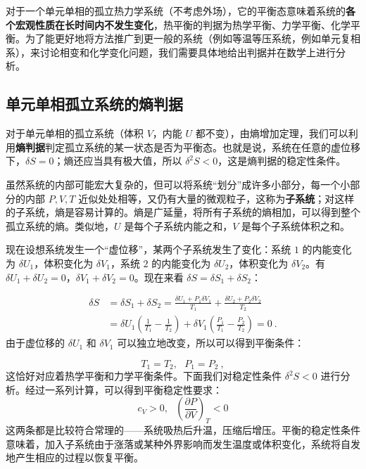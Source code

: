 
对于一个单元单相的孤立热力学系统（不考虑外场），它的平衡态意味着系统的\textbf{各个宏观性质在长时间内不发生变化}，热平衡的判据为热学平衡、力学平衡、化学平衡。为了能更好地将方法推广到更一般的系统（例如等温等压系统，例如单元复相系），来讨论相变和化学变化问题，我们需要具体地给出判据并在数学上进行分析。

\subsection{单元单相孤立系统的熵判据}

对于单元单相的孤立系统（体积 $V$，内能 $U$ 都不变），由熵增加定理，我们可以利用\textbf{熵判据}判定孤立系统的某一状态是否为平衡态。也就是说，系统在任意的虚位移下，$\delta S=0$；熵还应当具有极大值，所以 $\delta^2S<0$，这是熵判据的稳定性条件。

虽然系统的内部可能宏大复杂的，但可以将系统“划分”成许多小部分，每一个小部分的内部 $P,V,T$ 近似处处相等，又仍有大量的微观粒子，这称为\textbf{子系统}；对这样的子系统，熵是容易计算的。熵是广延量，将所有子系统的熵相加，可以得到整个孤立系统的熵。类似地，$U$ 是每个子系统内能之和，$V$ 是每个子系统体积之和。

现在设想系统发生一个“虚位移”，某两个子系统发生了变化：系统 $1$ 的内能变化为 $\delta U_1$，体积变化为 $\delta V_1$，系统 $2$ 的内能变化为 $\delta U_2$，体积变化为 $\delta V_2$。有 $\delta U_1+\delta U_2=0$，$\delta V_1+\delta V_2=0$。现在来看 $\delta S=\delta S_1+\delta S_2$：

\begin{align}
\delta S&=\delta S_1+\delta S_2=\frac{\delta U_1+P_1\delta V_1}{T_1}+\frac{\delta U_2+P_2\delta V_2}{T_2}
\\
&=\delta U_1\left(\frac{1}{T_1}-\frac{1}{T_2}\right)
+\delta V_1\left(\frac{P_1}{T_1}-\frac{P_2}{T_2}\right)=0~.
\end{align}
由于虚位移的 $\delta U_1$ 和 $\delta V_1$ 可以独立地改变，所以可以得到平衡条件：

\begin{equation}
T_1=T_2,\ \ \ P_1=P_2~,
\end{equation}
这恰好对应着热学平衡和力学平衡条件。下面我们对稳定性条件 $\delta^2 S<0$ 进行分析。经过一系列计算，可以得到平衡稳定性要求：
\begin{equation}
c_V>0,\ \ \ \left(\frac{\partial P}{\partial V}\right)_T<0
\end{equation}
这两条都是比较符合常理的——系统吸热后升温，压缩后增压。平衡的稳定性条件意味着，加入子系统由于涨落或某种外界影响而发生温度或体积变化，系统将自发地产生相应的过程以恢复平衡。

